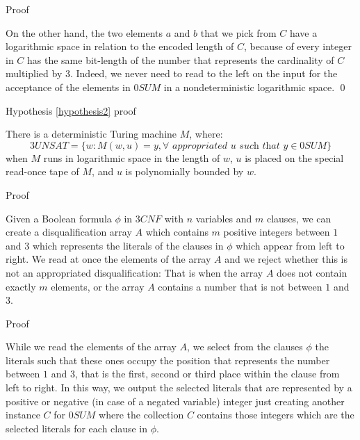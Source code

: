 \documentclass[11pt]{beamer}
\begin{document}
\begin{frame}{Proof}

On the other hand, the two elements $a$ and $b$ that we pick from $C$ have a logarithmic space in relation to the encoded length of $C$, because of every integer in $C$ has the same bit-length of the number that represents the cardinality of $C$ multiplied by $3$. Indeed, we never need to read to the left on the input for the acceptance of the elements in $0SUM$ in a nondeterministic logarithmic space. \qed

\end{frame}

\begin{frame}{Hypothesis \ref{hypothesis2} proof}

\begin{theorem}
\label{demonstration}
There is a deterministic Turing machine $M$, where:
\[3UNSAT = \{w: M(w, u) = y, \forall \textit{ appropriated } u \textit{ such that } y \in 0SUM\}\]
when $M$ runs in logarithmic space in the length of $w$, $u$ is placed on the special read-once tape of $M$, and $u$ is polynomially bounded by $w$.
\end{theorem}

\end{frame}

\begin{frame}{Proof}

Given a Boolean formula $\phi$ in $3CNF$ with $n$ variables and $m$ clauses, we can create a disqualification array $A$ which contains $m$ positive integers between $1$ and $3$ which represents the literals of the clauses in $\phi$ which appear from left to right. We read at once the elements of the array $A$ and we reject whether this is not an appropriated disqualification: That is when the array $A$ does not contain exactly $m$ elements, or the array $A$ contains a number that is not between $1$ and $3$.

\end{frame}

\begin{frame}{Proof}

While we read the elements of the array $A$, we select from the clauses $\phi$ the literals such that these ones occupy the position that represents the number between $1$ and $3$, that is the first, second or third place within the clause from left to right. In this way, we output the selected literals that are represented by a positive or negative (in case of a negated variable) integer just creating another instance $C$ for $0SUM$ where the collection $C$ contains those integers which are the selected literals for each clause in $\phi$.

\end{frame}
\end{document}
